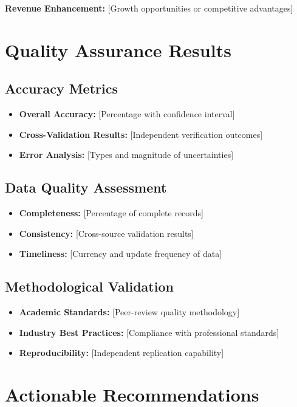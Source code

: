 \documentclass[11pt,letterpaper]{article}
\begin{document}
\textbf{Revenue Enhancement:} [Growth opportunities or competitive advantages]

\section{Quality Assurance Results}

\subsection{Accuracy Metrics}
\begin{itemize}
    \item \textbf{Overall Accuracy:} [Percentage with confidence interval]
    \item \textbf{Cross-Validation Results:} [Independent verification outcomes]
    \item \textbf{Error Analysis:} [Types and magnitude of uncertainties]
\end{itemize}

\subsection{Data Quality Assessment}
\begin{itemize}
    \item \textbf{Completeness:} [Percentage of complete records]
    \item \textbf{Consistency:} [Cross-source validation results]
    \item \textbf{Timeliness:} [Currency and update frequency of data]
\end{itemize}

\subsection{Methodological Validation}
\begin{itemize}
    \item \textbf{Academic Standards:} [Peer-review quality methodology]
    \item \textbf{Industry Best Practices:} [Compliance with professional standards]
    \item \textbf{Reproducibility:} [Independent replication capability]
\end{itemize}

\section{Actionable Recommendations}
\end{document}
